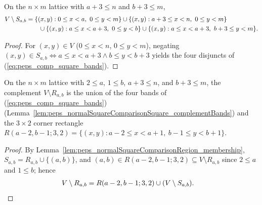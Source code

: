 \begin{lemma}%
    \label{lem:peps_normalSquareComparisonSquare_complementBands}
    \leanok
    On the $n\times m$ lattice with $a+3\le n$ and $b+3\le m$,
    \begin{align}
        V\setminus S_{a,b}
         & =
        \{(x,y):0\le x<a,\ 0\le y<m\}
        \cup
        \{(x,y):a+3\le x<n,\ 0\le y<m\}
        \notag        \\
         & \qquad\cup
        \{(x,y):a\le x<a+3,\ 0\le y<b\}
        \cup
        \{(x,y):a\le x<a+3,\ b+3\le y<m\}.
        \label{eq:peps_comp_square_bands}
    \end{align}
\end{lemma}
\begin{proof}\leanok
    For $(x,y)\in V$ ($0\le x<n$, $0\le y<m$), negating
    $(x,y)\in S_{a,b}\Longleftrightarrow a\le x<a+3\wedge b\le y<b+3$ yields the
    four disjuncts of (\ref{eq:peps_comp_square_bands}).
\end{proof}

\begin{lemma}%
    \label{lem:peps_normalSquareComparisonRegion_complementBands}
    \leanok
    On the $n\times m$ lattice with $2\le a$, $1\le b$, $a+3\le n$, and
    $b+3\le m$, the complement $V\setminus R_{a,b}$ is the union of the four
    bands of (\ref{eq:peps_comp_square_bands})
    (Lemma~\ref{lem:peps_normalSquareComparisonSquare_complementBands}) and the
    $3\times 2$ corner rectangle
    $R(a-2,b-1;3,2)=\{(x,y):a-2\le x<a+1,\ b-1\le y<b+1\}$.
\end{lemma}
\begin{proof}\leanok
    By Lemma~\ref{lem:peps_normalSquareComparisonRegion_membership},
    $S_{a,b}=R_{a,b}\cup\{(a,b)\}$, and $(a,b)\in R(a-2,b-1;3,2)\subseteq
        V\setminus R_{a,b}$ since $2\le a$ and $1\le b$; hence
    \begin{align}
        V\setminus R_{a,b}
         & =
        R(a-2,b-1;3,2)\cup(V\setminus S_{a,b}).
        \notag
    \end{align}
\end{proof}

